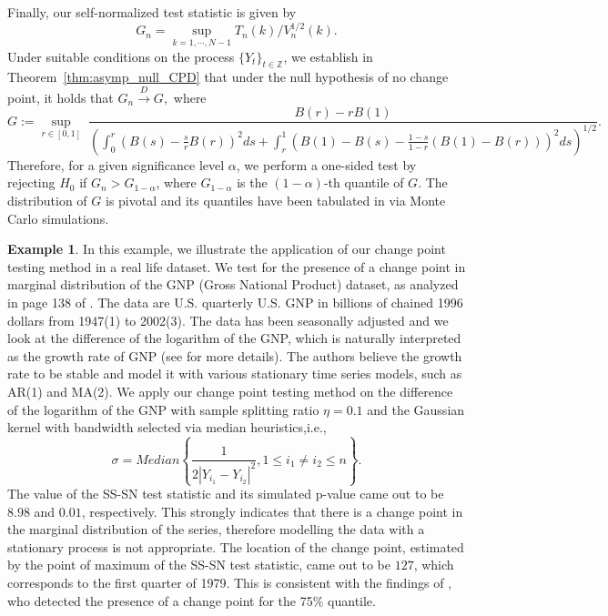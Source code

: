 \documentclass[11pt]{article}
\theoremstyle{plain}
\theoremstyle{definition}
\newtheorem*{example}{Example}
\theoremstyle{remark}
\begin{document}
Finally, our self-normalized test statistic is given by
\begin{equation}\label{eqn:Gn_CPD}
    G_n=\sup_{k=1,\cdots,N-1}T_n(k)/V^{1/2}_n(k).
\end{equation}
Under suitable  conditions on the process $\{Y_t\}_{t \in \mathbb{Z}}$, we establish in Theorem~\ref{thm:asymp_null_CPD} that under the null hypothesis of no change point, it holds that $G_n \overset{D}{\to}G,$ where
\begin{equation}\label{defn:Defn_of_G}
    G:=\sup_{r\in[0,1]}\;\frac{B(r)-rB(1)}{\left(\int_{0}^{r}(B(s)-\frac{s}{r}B(r))^2 ds+\int_{r}^{1}(B(1)-B(s)-\frac{1-s}{1-r}(B(1)-B(r)))^2 ds\right)^{1/2}}.
\end{equation}
Therefore, for a given significance level $\alpha$, we perform a one-sided test by rejecting $H_0$ if $G_n>G_{1-\alpha}$, where $G_{1-\alpha}$ is the $(1-\alpha)$-th quantile of $G$. The distribution of $G$ is pivotal and its quantiles have been tabulated in \cite{gao2023dimension} via Monte Carlo simulations.
\begin{example}
   In this example, we illustrate the application of our change point testing method in a real life dataset. We test for the presence of a change point in marginal distribution of the GNP (Gross National Product) dataset, as
analyzed in page 138 of \cite{shumway2006time}. The data
are U.S. quarterly U.S. GNP in billions of chained 1996 dollars from 1947(1) to 2002(3). The data has been seasonally
adjusted and we look at
the difference of the logarithm of the GNP, which is naturally
interpreted as the growth rate of GNP (see \cite{shumway2006time} for more details). The authors believe the growth rate to be stable and model it with various stationary time series models, such as AR(1) and MA(2). We apply our change point testing method on the difference of the logarithm of the GNP with sample splitting ratio $\eta=0.1$ and the Gaussian kernel with bandwidth selected via median heuristics,i.e.,
\[\sigma=Median\left\{\frac{1}{2|Y_{i_1}-Y_{i_2}|^2}, 1\leq i_1\neq i_2 \leq n\right\}.\]
The value of the SS-SN test statistic and its simulated p-value came out to be $8.98$ and $0.01$, respectively. This strongly indicates that there is a change point in the marginal distribution of the series, therefore  modelling the data with a stationary process is not appropriate. The location of the change point, estimated by the point of maximum of the SS-SN test statistic, came out to be $127$, which corresponds to the first quarter of 1979. This is consistent with the findings of \cite{shao2010testing}, who detected the presence of a change point for the 75$\%$ quantile.
\end{example}
\end{document}
